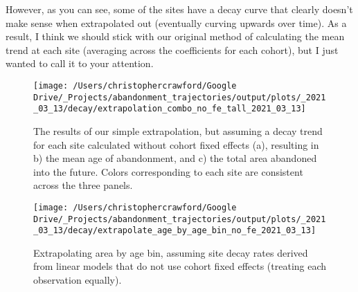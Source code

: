 \documentclass[
]{article}
\begin{document}
However, as you can see, some of the sites have a decay curve that clearly doesn't make sense when extrapolated out (eventually curving upwards over time).
As a result, I think we should stick with our original method of calculating the mean trend at each site (averaging across the coefficients for each cohort), but I just wanted to call it to your attention.



\begin{figure}
\texttt{[image: /Users/christophercrawford/Google Drive/\_Projects/abandonment\_trajectories/output/plots/\_2021\_03\_13/decay/extrapolation\_combo\_no\_fe\_tall\_2021\_03\_13]} \caption{The results of our simple extrapolation, but assuming a decay trend for each site calculated without cohort fixed effects (a), resulting in b) the mean age of abandonment, and c) the total area abandoned into the future. Colors corresponding to each site are consistent across the three panels.}\label{fig:extrapolation-combo-no-fe}
\end{figure}







\begin{figure}
\texttt{[image: /Users/christophercrawford/Google Drive/\_Projects/abandonment\_trajectories/output/plots/\_2021\_03\_13/decay/extrapolate\_age\_by\_age\_bin\_no\_fe\_2021\_03\_13]} \caption{Extrapolating area by age bin, assuming site decay rates derived from linear models that do not use cohort fixed effects (treating each observation equally).}\label{fig:extrapolation-area-by-age-no-fe}
\end{figure}
\end{document}
